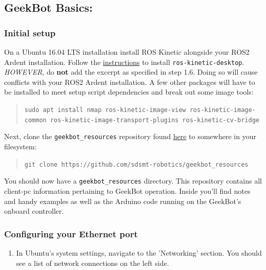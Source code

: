 \hypertarget{geekbot-basics}{%
\subsection{GeekBot Basics:}\label{geekbot-basics}}

\hypertarget{initial-setup}{%
\subsubsection{Initial setup}\label{initial-setup}}

On a Ubuntu 16.04 LTS installation install ROS Kinetic alongside your
ROS2 Ardent installation. Follow the
\href{http://wiki.ros.org/kinetic/Installation/Ubuntu/}{instructions} to
install \texttt{ros-kinetic-desktop}. \emph{HOWEVER}, do \textbf{not}
add the excerpt as specified in step 1.6. Doing so will cause conflicts
with your ROS2 Ardent installation. A few other packages will have to be
installed to meet setup script dependencies and break out some image
tools:

\begin{quote}
\texttt{sudo\ apt\ install\ nmap\ ros-kinetic-image-view\ ros-kinetic-image-common\ ros-kinetic-image-transport-plugins\ ros-kinetic-cv-bridge}
\end{quote}

Next, clone the \texttt{geekbot\_resources} repository found
\href{https://github.com/sdsmt-robotics/geekbot_resources/}{here} to
somewhere in your filesystem:

\begin{quote}
\texttt{git\ clone\ https://github.com/sdsmt-robotics/geekbot\_resources}
\end{quote}

You should now have a \texttt{geekbot\_resources} directory. This
repository contains all client-pc information pertaining to GeekBot
operation. Inside you'll find notes and handy examples as well as the
Arduino code running on the GeekBot's onboard controller.

\hypertarget{configuring-your-ethernet-port}{%
\subsubsection{Configuring your Ethernet
port}\label{configuring-your-ethernet-port}}

\begin{enumerate}
\def\labelenumi{\arabic{enumi}.}
\tightlist
\item
  In Ubuntu's system settings, navigate to the 'Networking' section. You
  should see a list of network connections on the left side.
\end{enumerate}

